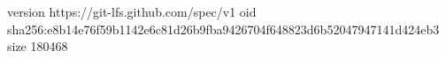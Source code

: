 version https://git-lfs.github.com/spec/v1
oid sha256:e8b14e76f59b1142e6c81d26b9fba9426704f648823d6b52047947141d424eb3
size 180468
